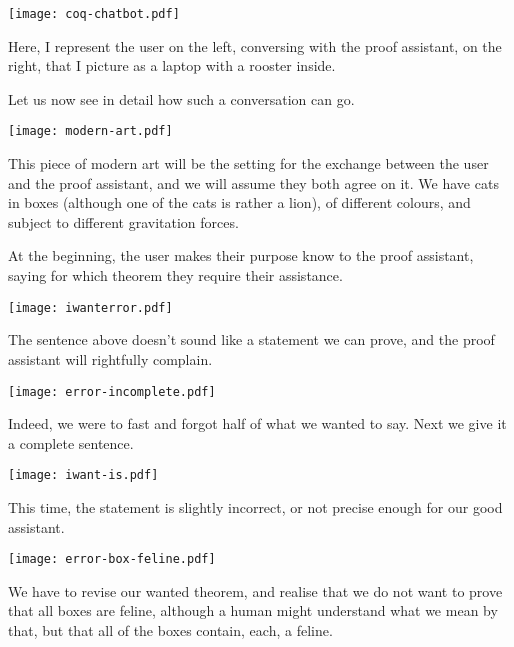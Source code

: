 \begin{center}
  \texttt{[image: coq-chatbot.pdf]}
\end{center}

Here, I represent the user on the left, conversing with the proof assistant, on
the right, that I picture as a laptop with a rooster inside.

Let us now see in detail how such a conversation can go.

\begin{center}
  \texttt{[image: modern-art.pdf]}
\end{center}

This piece of modern art will be the setting for the exchange between the user
and the proof assistant, and we will assume they both agree on it.
We have cats in boxes (although one of the cats is rather a lion), of different
colours, and subject to different gravitation forces.

At the beginning, the user makes their purpose know to the proof assistant,
saying for which theorem they require their assistance.

\begin{center}
  \texttt{[image: iwanterror.pdf]}
\end{center}

The sentence above doesn't sound like a statement we can prove, and the proof
assistant will rightfully complain.

\begin{center}
  \texttt{[image: error-incomplete.pdf]}
\end{center}

Indeed, we were to fast and forgot half of what we wanted to say. Next we give
it a complete sentence.

\begin{center}
  \texttt{[image: iwant-is.pdf]}
\end{center}

This time, the statement is slightly incorrect, or not precise enough for our
good assistant.

\begin{center}
  \texttt{[image: error-box-feline.pdf]}
\end{center}

We have to revise our wanted theorem, and realise that we do not want to prove
that all boxes are feline, although a human might understand what we mean by
that, but that all of the boxes contain, each, a feline.

